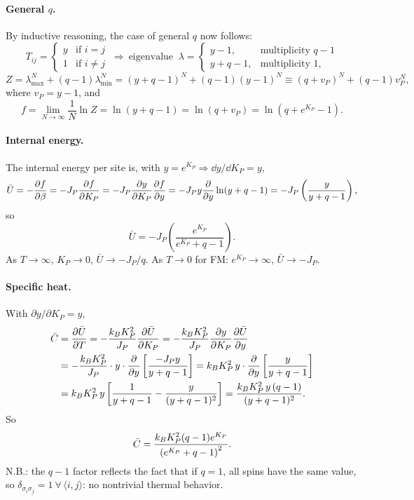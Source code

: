 \paragraph{General $q$.} By inductive reasoning, the case of general $q$ now follows:
\begin{equation}
  T_{ij} = \begin{cases} y & \text{if } i = j\\ 1 & \text{if } i\ne j\end{cases}
  \ \Rightarrow\ \text{eigenvalue }\
  \lambda = \begin{cases} y-1, & \text{multiplicity } q-1\\ y+q-1, & \text{multiplicity } 1,\end{cases}
\end{equation}
\begin{equation}
  Z = \lambda_{\max}^N + (q-1)\lambda_{\min}^N = (y+q-1)^N + (q-1)(y-1)^N\equiv(q+v_P)^N + (q-1)v_P^N,
\end{equation}
where $v_P = y-1$, and
\begin{equation}
  f = \lim_{N\to\infty}\frac{1}{N}\ln Z = \ln(y+q-1) = \ln(q+v_P) = \ln\left(q+e^{K_P}-1\right).
\end{equation}

\paragraph{Internal energy.} The internal energy per site is, with $y = e^{K_P}\Rightarrow\dd y/\dd K_P = y$,
\begin{equation}
  \bar U = -\frac{\partial f}{\partial \beta} = -J_P\frac{\partial f}{\partial K_P} = -J_P\frac{\partial y}{\partial K_P}\frac{\partial f}{\partial y}
  = -J_Py\frac{\partial }{\partial y}\ln(y+q-1) = -J_P\left(\frac{y}{y+q-1}\right),
\end{equation}
so
\begin{equation}
  \bar U = -J_P\left(\frac{e^{K_P}}{e^{K_P}+q-1}\right).
\end{equation}
As $T\to\infty$, $K_P\to 0$, $\bar U\to-J_P/q$. As $T\to 0$ for FM: $e^{K_P}\to\infty$, $\bar U\to-J_P$.

\paragraph{Specific heat.} With $\partial y/\partial K_P = y$,
\begin{align}
  \bar C &= \frac{\partial \bar U}{\partial T} = -\frac{k_{B} K_P^2}{J_P}\frac{\partial \bar U}{\partial K_P} = -\frac{k_{B} K_P^2}{J_P}\frac{\partial y}{\partial K_P}\frac{\partial \bar U}{\partial y}\nonumber\\
  &= -\frac{k_{B} K_P^2}{J_P}\cdot y\cdot\frac{\partial }{\partial y}\left[\frac{-J_Py}{y+q-1}\right]
   = k_{B} K_P^2\,y\cdot\frac{\partial }{\partial y}\left[\frac{y}{y+q-1}\right]\nonumber\\
  &= k_{B} K_P^2\,y\left[\frac{1}{y+q-1}-\frac{y}{(y+q-1)^2}\right] = \frac{k_{B} K_P^2\,y\,(q-1)}{(y+q-1)^2}.
\end{align}
So
\begin{equation}
  \bar C = \frac{k_{B} K_P^2(q-1)e^{K_P}}{\left(e^{K_P}+q-1\right)^2}.
\end{equation}
N.B.: the $q-1$ factor reflects the fact that if $q = 1$, all spins have the same value, so
$\delta_{\sigma_i\sigma_j} = 1\ \forall\,\langle i,j\rangle$: no nontrivial thermal behavior.

